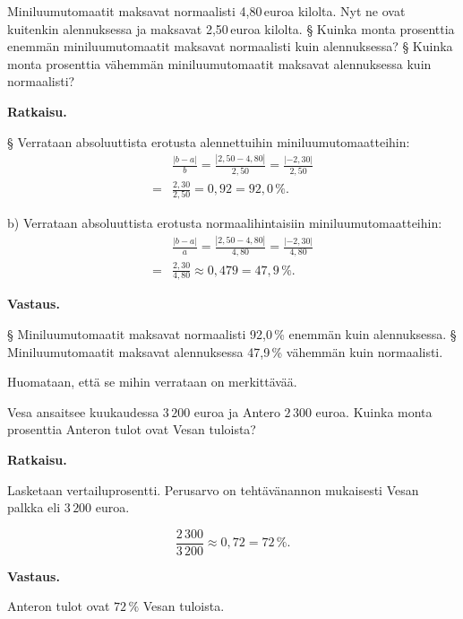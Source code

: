 \begin{esimerkki}
    Miniluumutomaatit maksavat normaalisti 4,80\,euroa kilolta. Nyt ne ovat kuitenkin alennuksessa ja maksavat 2,50\,euroa kilolta.
     \newline
§ Kuinka monta prosenttia enemmän miniluumutomaatit maksavat normaalisti kuin alennuksessa?
     \newline
§ Kuinka monta prosenttia vähemmän miniluumutomaatit maksavat alennuksessa kuin normaalisti?
     
     \textbf{Ratkaisu.}
     
§ Verrataan absoluuttista erotusta alennettuihin miniluumutomaatteihin:
\begin{align*}
     &\frac{|b-a|}{b}  = \frac{|2,50-4,80|}{2,50} = \frac{|-2,30|}{2,50} \\
     = &\frac{2,30}{2,50}  = 0,92 = 92,0\,\%.
\end{align*}
    
    
b) Verrataan absoluuttista erotusta normaalihintaisiin miniluumutomaatteihin:
\begin{align*}
     &\frac{|b-a|}{a} = \frac{|2,50-4,80|}{4,80} = \frac{|-2,30|}{4,80} \\
     = &\frac{2,30}{4,80}  \approx 0,479  = 47,9\,\%.
\end{align*}

     \textbf{Vastaus.}
     
    
§ Miniluumutomaatit maksavat normaalisti 92,0\,\% enemmän kuin alennuksessa.
     \newline
§ Miniluumutomaatit maksavat alennuksessa 47,9\,\% vähemmän kuin normaalisti.
     
     Huomataan, että se mihin verrataan on merkittävää.
     \end{esimerkki}
    

\begin{esimerkki}
    Vesa ansaitsee kuukaudessa ${3\,200}$ euroa ja Antero ${2\,300}$ euroa.
    Kuinka monta prosenttia Anteron tulot ovat Vesan tuloista? 
    
    \textbf{Ratkaisu.}
    
    Lasketaan vertailuprosentti. Perusarvo on tehtävänannon mukaisesti
    Vesan palkka eli ${3\,200}$ euroa.
    
    \[
        \frac{2\,300}{3\,200} 
        \approx 0,72
        = 72\,\%.
    \]
    
    \textbf{Vastaus.}
    
    Anteron tulot ovat $72\,\%$ Vesan tuloista.
\end{esimerkki}

